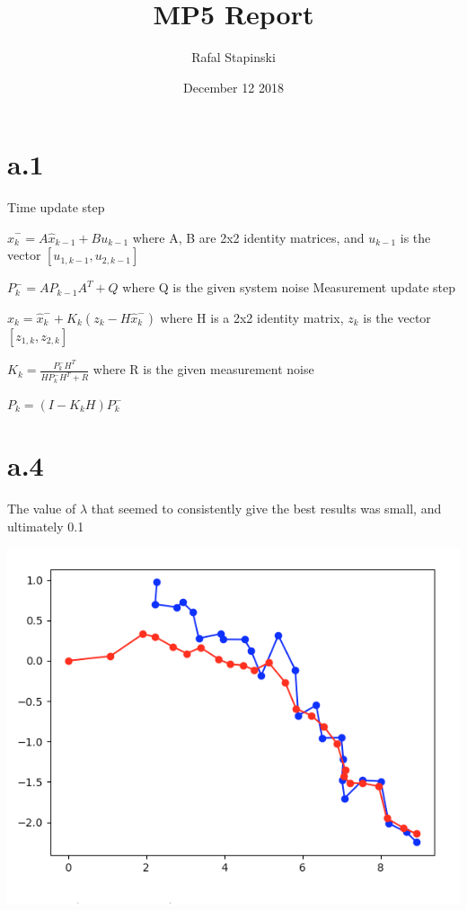 \documentclass{article}
\title{MP5 Report}
\author{Rafal Stapinski}
\date{December 12 2018}
\begin{document}
\maketitle

\section{a.1}

Time update step \newline \newline

$\hat{x}^{-}_{k} = A \hat{x}_{k-1} + B u_{k-1} $ where A, B are 2x2 identity matrices, and $u_{k-1}$ is the vector $[u_{1,k-1}, u_{2,k-1}]$ \newline \newline

$P^{-}_{k} = A P_{k-1}A^{T} + Q$ where Q is the given system noise \newline \newline
Measurement update step \newline \newline

$\hat{x}_k = \hat{x}^{-}_{k} + K_k(z_k - H\hat{x}^-_k)$ where H is a 2x2 identity matrix, $z_k$ is the vector $[z_{1,k}, z_{2,k}]$ \newline \newline

$K_k = \frac{P^{-}_{k}H^T}{HP^-_k H^T + R}$ where R is the given measurement noise \newline \newline

$P_k = (I - K_k H)P^-_k$ \newline \newline

\newpage
\section{a.4}
The value of $\lambda$ that seemed to consistently give the best results was small, and ultimately 0.1 \newline

\includegraphics[scale=0.4]{plot.png}
\end{document}
